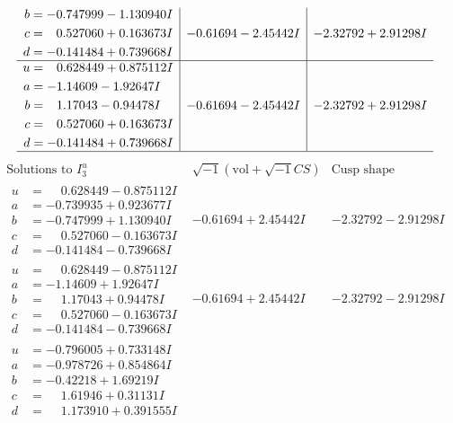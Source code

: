 \documentclass[1p]{elsarticle_modified}
\theoremstyle{definition}
\newcommand{\I}{\sqrt{-1}}
\begin{document}
$$\begin{array}{c|c|c}
\begin{aligned}
b &= -0.747999 - 1.130940 I \\
c &= \phantom{-}0.527060 + 0.163673 I \\
d &= -0.141484 + 0.739668 I\end{aligned}
 & -0.61694 - 2.45442 I & -2.32792 + 2.91298 I \\ \hline\begin{aligned}
u &= \phantom{-}0.628449 + 0.875112 I \\
a &= -1.14609 - 1.92647 I \\
b &= \phantom{-}1.17043 - 0.94478 I \\
c &= \phantom{-}0.527060 + 0.163673 I \\
d &= -0.141484 + 0.739668 I\end{aligned}
 & -0.61694 - 2.45442 I & -2.32792 + 2.91298 I\\
 \hline 
 \end{array}$$\newpage$$\begin{array}{c|c|c}  
\text{Solutions to }I^u_{3}& \I (\text{vol} + \sqrt{-1}CS) & \text{Cusp shape}\\
 \hline 
\begin{aligned}
u &= \phantom{-}0.628449 - 0.875112 I \\
a &= -0.739935 + 0.923677 I \\
b &= -0.747999 + 1.130940 I \\
c &= \phantom{-}0.527060 - 0.163673 I \\
d &= -0.141484 - 0.739668 I\end{aligned}
 & -0.61694 + 2.45442 I & -2.32792 - 2.91298 I \\ \hline\begin{aligned}
u &= \phantom{-}0.628449 - 0.875112 I \\
a &= -1.14609 + 1.92647 I \\
b &= \phantom{-}1.17043 + 0.94478 I \\
c &= \phantom{-}0.527060 - 0.163673 I \\
d &= -0.141484 - 0.739668 I\end{aligned}
 & -0.61694 + 2.45442 I & -2.32792 - 2.91298 I \\ \hline\begin{aligned}
u &= -0.796005 + 0.733148 I \\
a &= -0.978726 + 0.854864 I \\
b &= -0.42218 + 1.69219 I \\
c &= \phantom{-}1.61946 + 0.31131 I \\
d &= \phantom{-}1.173910 + 0.391555 I\end{aligned}

\end{array}$$
\end{document}

